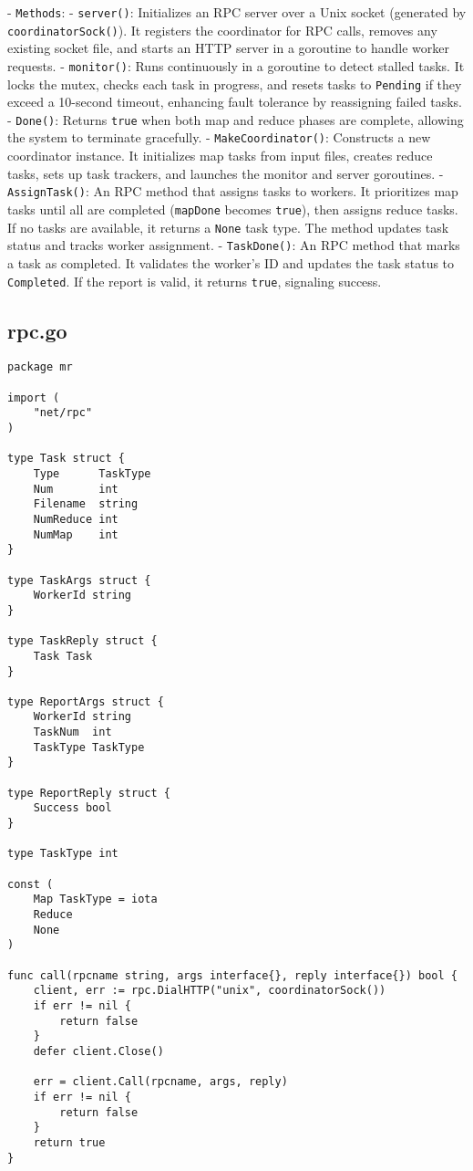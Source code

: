 \documentclass[a4paper,12pt]{article}
\begin{document}
- \texttt{Methods}:
  - \texttt{server()}: Initializes an RPC server over a Unix socket (generated by \texttt{coordinatorSock()}). It registers the coordinator for RPC calls, removes any existing socket file, and starts an HTTP server in a goroutine to handle worker requests.
  - \texttt{monitor()}: Runs continuously in a goroutine to detect stalled tasks. It locks the mutex, checks each task in progress, and resets tasks to \texttt{Pending} if they exceed a 10-second timeout, enhancing fault tolerance by reassigning failed tasks.
  - \texttt{Done()}: Returns \texttt{true} when both map and reduce phases are complete, allowing the system to terminate gracefully.
  - \texttt{MakeCoordinator()}: Constructs a new coordinator instance. It initializes map tasks from input files, creates reduce tasks, sets up task trackers, and launches the monitor and server goroutines.
  - \texttt{AssignTask()}: An RPC method that assigns tasks to workers. It prioritizes map tasks until all are completed (\texttt{mapDone} becomes \texttt{true}), then assigns reduce tasks. If no tasks are available, it returns a \texttt{None} task type. The method updates task status and tracks worker assignment.
  - \texttt{TaskDone()}: An RPC method that marks a task as completed. It validates the worker’s ID and updates the task status to \texttt{Completed}. If the report is valid, it returns \texttt{true}, signaling success.

\subsection{rpc.go}
\begin{lstlisting}
package mr

import (
	"net/rpc"
)

type Task struct {
	Type      TaskType
	Num       int
	Filename  string
	NumReduce int
	NumMap    int
}

type TaskArgs struct {
	WorkerId string
}

type TaskReply struct {
	Task Task
}

type ReportArgs struct {
	WorkerId string
	TaskNum  int
	TaskType TaskType
}

type ReportReply struct {
	Success bool
}

type TaskType int

const (
	Map TaskType = iota
	Reduce
	None
)

func call(rpcname string, args interface{}, reply interface{}) bool {
	client, err := rpc.DialHTTP("unix", coordinatorSock())
	if err != nil {
		return false
	}
	defer client.Close()

	err = client.Call(rpcname, args, reply)
	if err != nil {
		return false
	}
	return true
}
\end{lstlisting}
\end{document}
